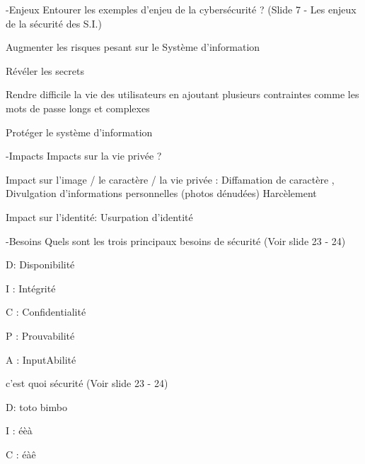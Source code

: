 

\begin{multi}[multiple=true]{-Enjeux}
	Entourer les exemples d'enjeu de la cybers\'ecurit\'e ? (Slide 7 - Les enjeux de la s\'ecurit\'e des S.I.)
\item 	Augmenter les risques pesant sur le Syst\`eme d'information
\item 	R\'ev\'eler les secrets
\item	Rendre difficile la vie des utilisateurs en ajoutant plusieurs contraintes comme les mots de passe longs et complexes
\item* 	Prot\'eger le syst\`eme d'information
\end{multi}%

\begin{multi}[multiple=true]{-Impacts}
	Impacts sur la vie priv\'ee  ?
\item* 	Impact sur l'image / le caract\`ere / la vie priv\'ee : Diffamation de caract\`ere , Divulgation d'informations personnelles (photos d\'enud\'ees) Harc\`element
\item*	Impact sur l'identit\'e: Usurpation d'identit\'e
 \end{multi}%

\begin{multi}[multiple=true]{-Besoins}
	Quels sont les trois principaux besoins de s\'ecurit\'e (Voir slide 23 - 24)
\item* 	D: Disponibilit\'e
\item* 	I : Int\'egrit\'e
\item*	C : Confidentialit\'e
\item  P : Prouvabilit\'e
\item  A : InputAbilit\'e
\end{multi}%


\begin{multi}[multiple=true]{}
	c'est quoi sécurité (Voir slide 23 - 24)
\item* 	D: toto bimbo
\item* 	I : éèà
\item*	C : éàê
\end{multi}%



